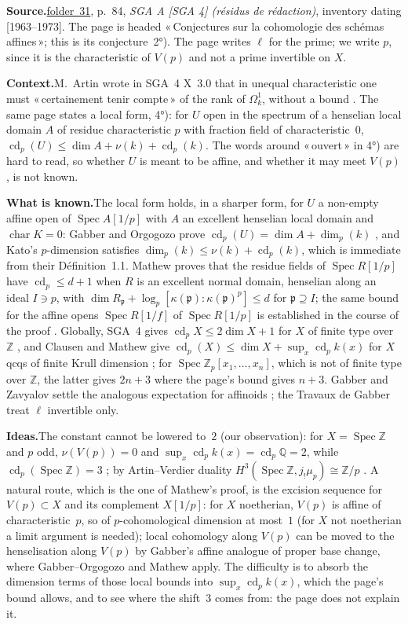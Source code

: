 \documentclass[11pt]{article}
\newcommand{\q}[1]{«\,#1\,»}
\newcommand{\fac}[1]{\href{https://grothendieck.umontpellier.fr/#1.pdf}{folder~#1}}
\newcommand{\cd}{\operatorname{cd}}
\newcommand{\Spec}{\operatorname{Spec}}
\theoremstyle{definition}
\theoremstyle{plain}\newtheorem*{proposition}{Proposition}\theoremstyle{definition}
\newcommand{\entry}[1]{\par\medskip\noindent\textbf{#1}\enspace}
\newcommand{\src}[1]{\entry{Source.}#1}
\newcommand{\ctx}{\entry{Context.}}
\newcommand{\known}{\entry{What is known.}}
\newcommand{\ideas}{\entry{Ideas.}}
\begin{document}
\src{\fac{31}, p.~84, \emph{SGA A [SGA 4] (résidus de rédaction)}, inventory dating [1963--1973]. The page is headed \q{Conjectures sur la cohomologie des schémas affines}; this is its conjecture~2°). The page writes $\ell$ for the prime; we write $p$, since it is the characteristic of $V(p)$ and not a prime invertible on $X$.}

\ctx M.~Artin wrote in SGA~4 X~3.0 that in unequal characteristic one must \q{certainement tenir compte} of the rank of $\Omega^1_k$, without a bound \cite{sga4}. The same page states a local form, 4°): for $U$ open in the spectrum of a henselian local domain $A$ of residue characteristic $p$ with fraction field of characteristic~$0$, $\cd_p(U) \le \dim A + \nu(k) + \cd_p(k)$. The words around \q{ouvert} in 4°) are hard to read, so whether $U$ is meant to be affine, and whether it may meet $V(p)$, is not known.

\known The local form holds, in a sharper form, for $U$ a non-empty affine open of $\Spec A[1/p]$ with $A$ an excellent henselian local domain and $\operatorname{char} K = 0$: Gabber and Orgogozo prove $\cd_p(U) = \dim A + \dim_p(k)$ \cite[Th.~6.1]{gabberorgogozo}, and Kato's $p$-dimension satisfies $\dim_p(k) \le \nu(k) + \cd_p(k)$, which is immediate from their Définition~1.1. Mathew proves that the residue fields of $\Spec R[1/p]$ have $\cd_p \le d+1$ when $R$ is an excellent normal domain, henselian along an ideal $I \ni p$, with $\dim R_{\mathfrak p} + \log_p [\kappa(\mathfrak p) : \kappa(\mathfrak p)^p] \le d$ for $\mathfrak p \supseteq I$; the same bound for the affine opens $\Spec R[1/f]$ of $\Spec R[1/p]$ is established in the course of the proof \cite[Prop.~4.5]{mathew}. Globally, SGA~4 gives $\cd_p X \le 2\dim X + 1$ for $X$ of finite type over $\mathbb Z$ \cite[X~6.2]{sga4}, and Clausen and Mathew give $\cd_p(X) \le \dim X + \sup_x \cd_p k(x)$ for $X$ qcqs of finite Krull dimension \cite[Cor.~3.29]{clausenmathew}; for $\Spec \mathbb Z_p[x_1,\dots,x_n]$, which is not of finite type over $\mathbb Z$, the latter gives $2n+3$ where the page's bound gives $n+3$. Gabber and Zavyalov settle the analogous expectation for affinoids \cite[Th.~1.7]{gabberzavyalov}; the Travaux de Gabber treat $\ell$ invertible only.

\ideas The constant cannot be lowered to~$2$ (our observation): for $X = \Spec \mathbb Z$ and $p$ odd, $\nu(V(p)) = 0$ and $\sup_x \cd_p k(x) = \cd_p \mathbb Q = 2$, while $\cd_p(\Spec \mathbb Z) = 3$ \cite[X~6.1]{sga4}; by Artin--Verdier duality $H^3(\Spec \mathbb Z, j_!\mu_p) \cong \mathbb Z/p$ \cite[II.3.2, 3.3]{milneadt}. A natural route, which is the one of Mathew's proof, is the excision sequence for $V(p) \subset X$ and its complement $X[1/p]$: for $X$ noetherian, $V(p)$ is affine of characteristic~$p$, so of $p$-cohomological dimension at most~$1$ \cite[X~5.1]{sga4} (for $X$ not noetherian a limit argument is needed); local cohomology along $V(p)$ can be moved to the henselisation along $V(p)$ by Gabber's affine analogue of proper base change, where Gabber--Orgogozo and Mathew apply. The difficulty is to absorb the dimension terms of those local bounds into $\sup_x \cd_p k(x)$, which the page's bound allows, and to see where the shift~$3$ comes from: the page does not explain it.
\end{document}
